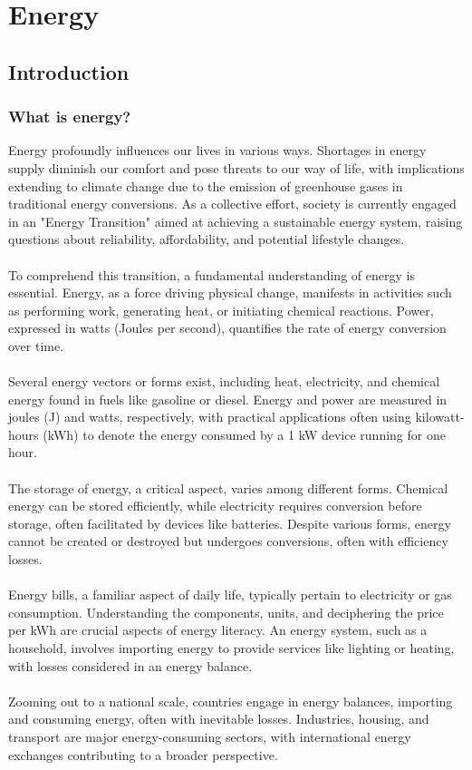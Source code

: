 \documentclass[../summary.tex]{subfiles}
\begin{document}
\section{Energy}
\subsection{Introduction}
\subsubsection{What is energy?}

Energy profoundly influences our lives in various ways. Shortages in energy supply diminish our comfort and pose threats to our way of life, with implications extending to climate change due to the emission of greenhouse gases in traditional energy conversions. As a collective effort, society is currently engaged in an "Energy Transition" aimed at achieving a sustainable energy system, raising questions about reliability, affordability, and potential lifestyle changes.\\
\\
To comprehend this transition, a fundamental understanding of energy is essential. Energy, as a force driving physical change, manifests in activities such as performing work, generating heat, or initiating chemical reactions. Power, expressed in watts (Joules per second), quantifies the rate of energy conversion over time.\\
\\
Several energy vectors or forms exist, including heat, electricity, and chemical energy found in fuels like gasoline or diesel. Energy and power are measured in joules (J) and watts, respectively, with practical applications often using kilowatt-hours (kWh) to denote the energy consumed by a 1 kW device running for one hour.\\
\\
The storage of energy, a critical aspect, varies among different forms. Chemical energy can be stored efficiently, while electricity requires conversion before storage, often facilitated by devices like batteries. Despite various forms, energy cannot be created or destroyed but undergoes conversions, often with efficiency losses.\\
\\
Energy bills, a familiar aspect of daily life, typically pertain to electricity or gas consumption. Understanding the components, units, and deciphering the price per kWh are crucial aspects of energy literacy. An energy system, such as a household, involves importing energy to provide services like lighting or heating, with losses considered in an energy balance.\\
\\
Zooming out to a national scale, countries engage in energy balances, importing and consuming energy, often with inevitable losses. Industries, housing, and transport are major energy-consuming sectors, with international energy exchanges contributing to a broader perspective.
\end{document}
